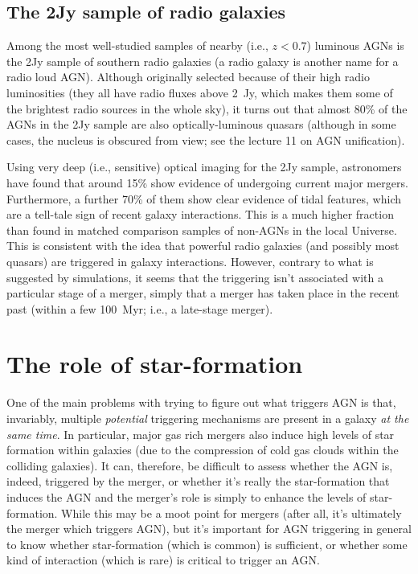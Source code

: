 \documentclass[11pt]{article}
\begin{document}
\subsection{The 2Jy sample of radio galaxies}
Among the most well-studied samples of nearby (i.e., $z<0.7$) luminous
AGNs is the 2Jy sample of southern radio galaxies (a radio galaxy is
another name for a radio loud AGN). Although originally selected
because of their high radio luminosities (they all have radio fluxes
above 2~Jy, which makes them some of the brightest radio sources in
the whole sky), it turns out that almost 80\% of the AGNs in the 2Jy
sample are also optically-luminous quasars (although in some cases,
the nucleus is obscured from view; see the lecture 11 on AGN
unification).

Using very deep (i.e., sensitive) optical imaging for the 2Jy sample,
astronomers have found that around 15\% show evidence of undergoing
current major mergers. Furthermore, a further 70\% of them show clear
evidence of tidal features, which are a tell-tale sign of recent
galaxy interactions. This is a much higher fraction than found in
matched comparison samples of non-AGNs in the local Universe. This is
consistent with the idea that powerful radio galaxies (and possibly
most quasars) are triggered in galaxy interactions. However, contrary
to what is suggested by simulations, it seems that the triggering
isn't associated with a particular stage of a merger, simply that a
merger has taken place in the recent past (within a few 100~Myr; i.e.,
a late-stage merger).

\section{The role of star-formation}
One of the main problems with trying to figure out what triggers AGN
is that, invariably, multiple {\it potential} triggering mechanisms
are present in a galaxy {\it at the same time}. In particular, major
gas rich mergers also induce high levels of star formation within
galaxies (due to the compression of cold gas clouds within the
colliding galaxies). It can, therefore, be difficult to assess whether
the AGN is, indeed, triggered by the merger, or whether it's really
the star-formation that induces the AGN and the merger's role is
simply to enhance the levels of star-formation. While this may be a
moot point for mergers (after all, it's ultimately the merger which
triggers AGN), but it's important for AGN triggering in general to
know whether star-formation (which is common) is sufficient, or
whether some kind of interaction (which is rare) is critical to
trigger an AGN.
\end{document}
